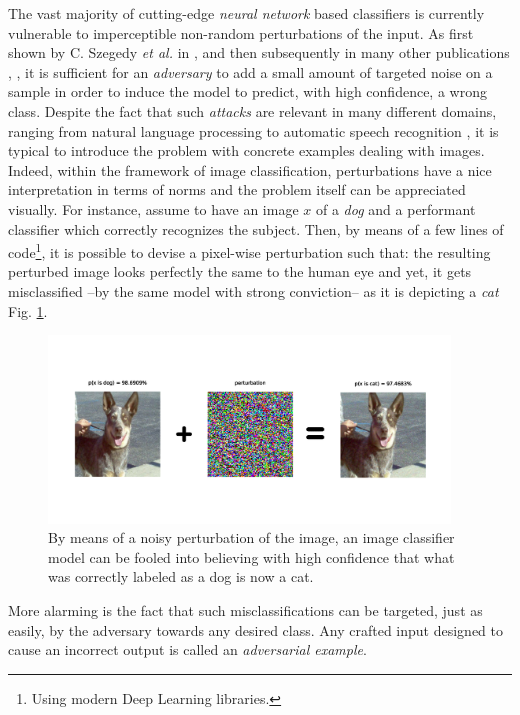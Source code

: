 \documentclass[LaM,binding=0.6cm]{./packages/sapthesis/sapthesis}
\begin{document}
        The vast majority of cutting-edge \textit{neural network} based classifiers is currently vulnerable to imperceptible non-random perturbations of the input.
        As first shown by C. Szegedy \textit{et al.} in \cite{szegedy2013-intriguing}, and then subsequently in many other publications \cite{journals/corr/NguyenYC14}, \cite{journals/corr/BiggioCNRMFGR14},
        it is sufficient for an \textit{adversary} to add a small amount of targeted noise on a sample in order to induce the model to predict, with high confidence,
        a wrong class. Despite the fact that such \textit{attacks} are relevant in many different domains, ranging from natural language processing \cite{nlp_adv} to automatic speech recognition \cite{speechrec_adv}, 
        it is typical to introduce the problem with concrete examples dealing with images.
        Indeed, within the framework of image classification, perturbations have a nice interpretation in terms of norms and the problem itself can be appreciated visually.
        For instance, assume to have an image $x$ of a \textit{dog} and a performant classifier which correctly recognizes the subject. Then, by means of a few lines of code\footnote{Using modern Deep Learning libraries.},
        it is possible to devise a pixel-wise perturbation such that: the resulting perturbed image looks perfectly the same to the human eye and yet, it gets misclassified --by the same model with strong conviction--
        as it is depicting a \textit{cat} Fig. \ref{fig:aecatdog}.  
        \begin{figure}[!h]
            \centering
            \includegraphics[width=0.95\textwidth]{prt.png}
            \caption{By means of a noisy perturbation of the image, an image classifier model can be fooled into believing with high confidence that what was correctly labeled as a dog is now a cat.}
            \label{fig:aecatdog}
        \end{figure}
        More alarming is the fact that such misclassifications can be targeted, just as easily, by the adversary towards any desired class. Any crafted input designed to 
        cause an incorrect output is called an \textit{adversarial example}.
\end{document}
